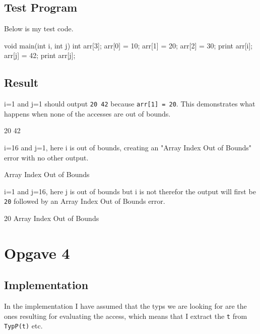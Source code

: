 \subsection{Test Program}
Below is my test code.
\begin{ccode}
void main(int i, int j) {
    int arr[3];
    arr[0] = 10;
    arr[1] = 20;
    arr[2] = 30;
    print arr[i];
    arr[j] = 42;
    print arr[j];
}
\end{ccode}
\subsection{Result}
i=1 and j=1 should output \texttt{20 42} because \texttt{arr[1] = 20}. This
demonstrates what happens when none of the accesses are out of bounds.
\begin{bashcode}
20 42 
\end{bashcode}
i=16 and j=1, here i is out of bounds, creating an "Array Index Out of Bounds"
error with no other output.
\begin{bashcode}
Array Index Out of Bounds
\end{bashcode}
i=1 and j=16, here j is out of bounds but i is not therefor the output will
first be \texttt{20} followed by an Array Index Out of Bounds error.
\begin{bashcode}
20 Array Index Out of Bounds
\end{bashcode}

\section{Opgave 4}
\subsection{Implementation}
In the implementation I have assumed that the typs we are looking for are the
ones resulting for evaluating the access, which means that I extract the
\texttt{t} from \texttt{TypP(t)} etc.

